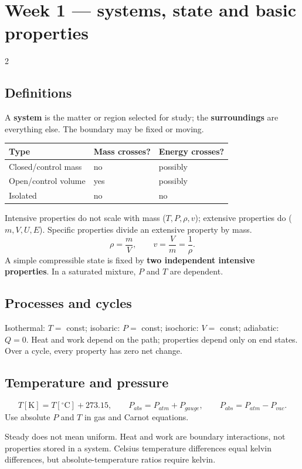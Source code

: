 \documentclass[9pt,a4paper]{extarticle}
\begin{document}
\section{Week 1 --- systems, state and basic properties}
\begin{multicols}{2}
\subsection{Definitions}
A \textbf{system} is the matter or region selected for study; the \textbf{surroundings} are everything else. The boundary may be fixed or moving.
\begin{center}\small
\begin{tabular}{lll}\toprule
Type & Mass crosses? & Energy crosses?\\\midrule
Closed/control mass & no & possibly\\
Open/control volume & yes & possibly\\
Isolated & no & no\\\bottomrule
\end{tabular}
\end{center}
Intensive properties do not scale with mass ($T,P,\rho,v$); extensive properties do ($m,V,U,E$). Specific properties divide an extensive property by mass.
\[
\rho=\frac{m}{V},\qquad v=\frac{V}{m}=\frac1\rho.
\]
A simple compressible state is fixed by \textbf{two independent intensive properties}. In a saturated mixture, $P$ and $T$ are dependent.

\subsection{Processes and cycles}
Isothermal: $T=$ const; isobaric: $P=$ const; isochoric: $V=$ const; adiabatic: $Q=0$. Heat and work depend on the path; properties depend only on end states. Over a cycle, every property has zero net change.

\subsection{Temperature and pressure}
\[
T[\mathrm K]=T[^{\circ}\mathrm C]+273.15,
\qquad P_{abs}=P_{atm}+P_{gauge},
\qquad P_{abs}=P_{atm}-P_{vac}.
\]
Use absolute $P$ and $T$ in gas and Carnot equations.

\begin{trap}
Steady does not mean uniform. Heat and work are boundary interactions, not properties stored in a system. Celsius temperature differences equal kelvin differences, but absolute-temperature ratios require kelvin.
\end{trap}
\end{multicols}
\end{document}
